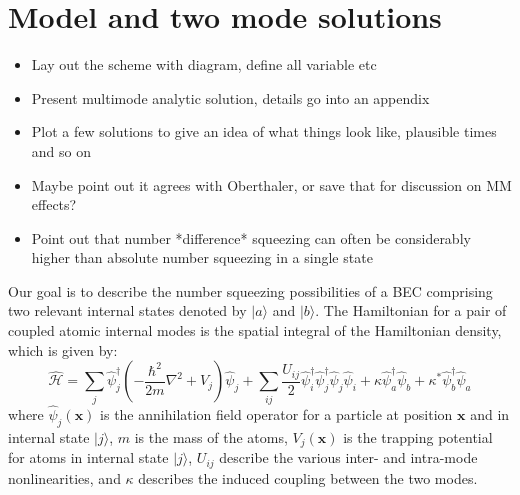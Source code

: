 \documentclass{iopart}
\begin{document}
\section{Model and two mode solutions}
\label{secTwoModeAnalytic}
\begin{itemize}
  \item Lay out the scheme with diagram, define all variable etc
  \item Present multimode analytic solution, details go into an appendix
  \item Plot a few solutions to give an idea of what things look like, plausible times and so on
  \item Maybe point out it agrees with Oberthaler, or save that for discussion on MM effects?
  \item Point out that number *difference* squeezing can often be considerably higher than absolute number squeezing in a single state
\end{itemize}
Our goal is to describe the number squeezing possibilities of a BEC comprising two relevant internal states denoted by $|a\rangle$ and $|b\rangle$.  The Hamiltonian for a pair of coupled atomic internal modes is the spatial integral of the Hamiltonian density, which is given by:
\begin{equation}
\hat{\mathcal{H}} = \sum_{j} \hat{\psi}_j^{\dagger}\left(-\frac{\hbar^2}{2 m}\nabla^2+V_j\right)\hat{\psi}_j 
          + \sum_{i j}\frac{U_{i j}}{2} \hat{\psi}_i^{\dagger} \hat{\psi}_j^{\dagger} \hat{\psi}_j \hat{\psi}_i
          + \kappa \hat{\psi}_a^{\dagger} \hat{\psi}_b + \kappa^* \hat{\psi}_b^{\dagger}  \hat{\psi}_a
\label{eqFieldHamiltonian}
\end{equation}
where $\hat{\psi}_j(\mathbf{x})$ is the annihilation field operator for a particle at position $\mathbf{x}$ and in internal state $|j\rangle$, $m$ is the mass of the atoms, $V_j(\mathbf{x})$ is the trapping potential for atoms in internal state $|j\rangle$, $U_{ij}$ describe the various inter- and intra-mode nonlinearities, and $\kappa$ describes the induced coupling between the two modes.  
\end{document}

